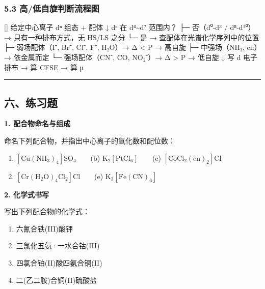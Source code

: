 \documentclass[a4paper,11pt]{ctexart}
\providecommand{\tightlist}{\setlength{\itemsep}{0pt}\setlength{\parskip}{0pt}}
\newenvironment{Shaded}{}{}
\newenvironment{Highlighting}{}{}
\newcommand{\NormalTok}[1]{#1}
\newcommand{\箭}{\ensuremath{\rightarrow}}
\newcommand{\左箭}{\ensuremath{\leftarrow}}
\newcommand{\上箭}{\ensuremath{\uparrow}}
\newcommand{\下箭}{\ensuremath{\downarrow}}
\newcommand{\衡}{\ensuremath{\rightleftharpoons}}
\newcommand{\双箭}{\ensuremath{\leftrightarrow}}
\newcommand{\约等于}{\ensuremath{\approx}}
\newcommand{\小于等于}{\ensuremath{\leq}}
\newcommand{\大于等于}{\ensuremath{\geq}}
\newcommand{\不等于}{\ensuremath{\neq}}
\newcommand{\西格马}{\ensuremath{\sigma}}
\newcommand{\派}{\ensuremath{\pi}}
\begin{document}
\subsubsection{5.3 高/低自旋判断流程图}\label{ux9ad8ux4f4eux81eaux65cbux5224ux65adux6d41ux7a0bux56fe}

\begin{Shaded}
\begin{Highlighting}[]
\NormalTok{给定中心离子 dⁿ 组态 + 配体}
\NormalTok{ ↓}
\NormalTok{dⁿ 在 d⁴\textasciitilde{}d⁷ 范围内？}
\NormalTok{├─ 否（d⁰{-}d³ / d⁸{-}d¹⁰）→ 只有一种排布方式，无 HS/LS 之分}
\NormalTok{└─ 是 → 查配体在光谱化学序列中的位置}
\NormalTok{ ├─ 弱场配体（I⁻, Br⁻, Cl⁻, F⁻, H₂O）→ Δ \textless{} P → 高自旋}
\NormalTok{ ├─ 中强场（NH₃, en）→ 依金属而定}
\NormalTok{ └─ 强场配体（CN⁻, CO, NO₂⁻）→ Δ \textgreater{} P → 低自旋}
\NormalTok{ ↓}
\NormalTok{写 d 电子排布 → 算 CFSE → 算 μ}
\end{Highlighting}
\end{Shaded}

\begin{center}\rule{0.5\linewidth}{0.5pt}\end{center}

\subsection{六、练习题}\label{ux516dux7ec3ux4e60ux9898}

\textbf{1. 配合物命名与组成}

命名下列配合物，并指出中心离子的氧化数和配位数：

\begin{enumerate}
\def\labelenumi{(\alph{enumi})}
\tightlist
\item
  \(\mathrm{[Cu(NH_3)_4]SO_4}\)　　(b) \(\mathrm{K_2[PtCl_6]}\)　　(c) \(\mathrm{[CoCl_2(en)_2]Cl}\)
\item
  \(\mathrm{[Cr(H_2O)_4Cl_2]Cl}\)　　(e) \(\mathrm{K_3[Fe(CN)_6]}\)
\end{enumerate}

\textbf{2. 化学式书写}

写出下列配合物的化学式：

\begin{enumerate}
\def\labelenumi{(\alph{enumi})}
\tightlist
\item
  六氰合铁(III)酸钾
\item
  三氯化五氨·一水合钴(III)
\item
  四氯合铂(II)酸四氨合铜(II)
\item
  二(乙二胺)合铜(II)硫酸盐
\end{enumerate}
\end{document}
